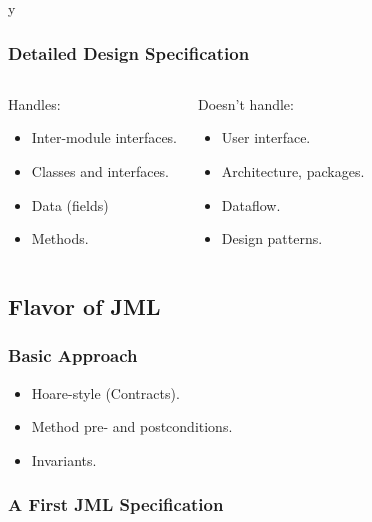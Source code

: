\if y\MAKEHANDOUTS \documentclass[t,compress,landscape,handout]{beamer}
\begin{document}
\begin{frame}
\frametitle{Detailed Design Specification}

\begin{columns}[t]
\begin{block}{Handles:}
\begin{itemize}
\item
Inter-module interfaces.

\item
Classes and interfaces.

\item 
Data (fields)

\item
Methods.
\end{itemize}
\end{block}

\pause

\begin{block}{Doesn't handle:}
\begin{itemize}
\item
User interface.

\item 
Architecture, packages.

\item
Dataflow.

\item
Design patterns.
\end{itemize}
\end{block}
\end{columns}
\end{frame}

\subsection[Flavor]{Flavor of JML}

\begin{frame}
\frametitle{Basic Approach}
\begin{itemize}
\item
Hoare-style (Contracts).

\item
Method pre- and postconditions.

\item
Invariants.
\end{itemize}
\end{frame}

\begin{frame}[fragile]
\frametitle{A First JML Specification}

\end{frame}
\end{document}
